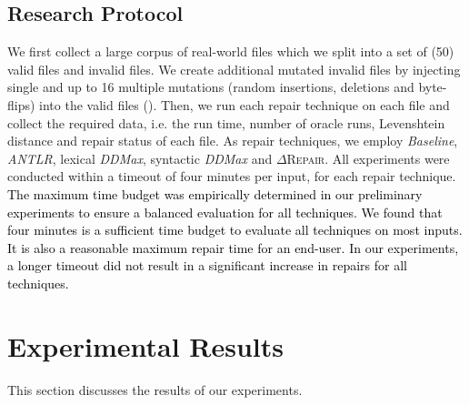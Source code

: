 \documentclass[acmsmall,screen,review,anonymous]{acmart}
\newcommand{\revise}[1]{\textcolor{black}{#1}}
\newcommand{\approach}{\textsc{$\Delta$Repair}\xspace}
\newcommand{\ddmax}{\textit{DDMax}\xspace}
\begin{document}
\subsection{Research Protocol}
We first collect a large corpus of  real-world files which we split into a set of (50) valid files and invalid files. We create additional mutated invalid files by injecting single and up to 16 multiple mutations (random insertions, deletions and byte-flips) into the valid files  
().
Then, we run each repair technique on each file and collect the required data, i.e. the run time, number of oracle runs, Levenshtein distance and repair status of each file.
As repair techniques, we employ \emph{Baseline}, %
\emph{ANTLR}, lexical \ddmax, syntactic \ddmax and \approach.
All experiments were conducted within a timeout of four minutes per input, for each repair technique. %
\revise{
The maximum time budget was empirically determined in our preliminary experiments to ensure a balanced evaluation for all techniques. We found that four minutes is a sufficient time budget to evaluate all techniques on most inputs. It is also a reasonable maximum repair time for an end-user. In our experiments, a longer timeout did not result in a significant increase in repairs for all techniques.}


\section{Experimental Results}
\label{sec:results}
This section discusses the %
results %
of our experiments. %
\end{document}
